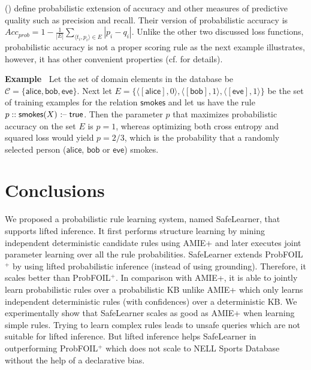 \documentclass[akbc,twoside,11pt]{article}
\newcounter{example}
\newenvironment{example}[1][]{\refstepcounter{example}\par\medskip\noindent
   \textbf{Example~\theexample #1} \rmfamily}{\medskip}
\newcommand{\algorithmname}{SafeLearner\xspace}
\begin{document}
\citeauthor{DBLP:conf/ijcai/RaedtDTBV15} (\citeyear{DBLP:conf/ijcai/RaedtDTBV15}) define probabilistic extension of accuracy and other measures of predictive quality such as precision and recall. Their version of probabilistic accuracy is
$\textit{Acc}_{\textit{prob}} = 1-\frac{1}{|E|} \sum_{\langle t_i, p_i \rangle \in E} \left| p_i - q_i \right|.$
Unlike the other two discussed loss functions, probabilistic accuracy is not a proper scoring rule as the next example illustrates, however, it has other convenient properties (cf. \citet{DBLP:conf/ijcai/RaedtDTBV15} for details). 
\begin{example}
Let the set of domain elements in the database be $\mathcal{C} = \{\mathsf{alice}, \mathsf{bob}, \mathsf{eve} \}$. Next let $E = \{ \langle [\mathsf{alice}], 0 \rangle, \langle [\mathsf{bob}], 1 \rangle, \langle [\mathsf{eve}], 1 \rangle \}$ be the set of training examples for the relation $\mathsf{smokes}$ and let us have the rule $p :: \mathsf{smokes}(X) \mbox{ \textnormal{:--}}\; \mathsf{true}$. Then the parameter $p$ that maximizes probabilistic accuracy on the set $E$ is $p = 1$, whereas optimizing both cross entropy and squared loss would yield $p = 2/3$, which is the probability that a randomly selected person ($\mathsf{alice}$, $\mathsf{bob}$ or $\mathsf{eve}$) smokes.
\end{example}

\section{Conclusions}
\label{sec:conc}
We proposed a probabilistic rule learning system, named \algorithmname, that supports lifted inference. It first performs structure learning by mining independent deterministic candidate rules using AMIE+ and later executes joint parameter learning over all the rule probabilities.
\algorithmname extends ProbFOIL$^+$ by using lifted probabilistic inference (instead of using grounding). 
Therefore, it scales better than ProbFOIL$^+$. In comparison with AMIE+, it is able to jointly learn probabilistic rules over a probabilistic KB unlike AMIE+ which only learns independent deterministic rules (with confidences) over a deterministic KB. We experimentally show that \algorithmname scales as good as AMIE+ when learning simple rules. Trying to learn complex rules leads to unsafe queries which are not suitable for lifted inference. But lifted inference helps \algorithmname in outperforming ProbFOIL$^+$ which does not scale to NELL Sports Database without the help of a declarative bias. 
\end{document}
